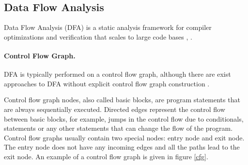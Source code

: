         \subsection{Data Flow Analysis}
        Data Flow Analysis (DFA) is a static analysis framework 
        for compiler optimizations and verification that 
        scales to large code bases 
        \cite{nielson1999principles}, \cite{aho1985compilers}.
        
        \paragraph{Control Flow Graph.} 
        DFA is typically performed on a control flow graph, 
        although there are exist approaches to DFA 
        without explicit control flow graph 
        construction \cite{mohnen2002graph}.
        
        Control flow graph nodes, also called basic blocks, 
        are program statements that are always sequentially executed. 
        Directed edges represent the control flow between basic blocks, 
        for example, jumps in the control flow due to conditionals, 
         statements or any other statements that can change 
        the flow of the program.        
        Control flow graphs usually contain two special nodes: 
        entry node and exit node. The entry node does not have any 
        incoming edges and all the paths lead to the exit node.        
        An example of a control flow graph is given in figure \ref{cfg}.
        

